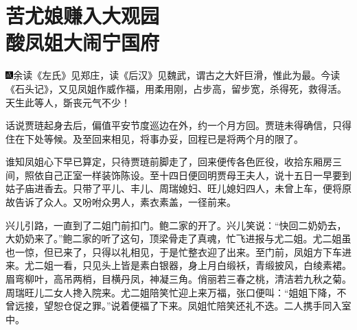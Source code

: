 
\chapter{苦尤娘赚入大观园\\酸凤姐大闹宁国府}

{\includegraphics[width=3mm]{../Images/00005}\kaishu 余读《左氏》见郑庄，读《后汉》见魏武，谓古之大奸巨滑，惟此为最。今读《石头记》，又见凤姐作威作福，用柔用刚，占步高，留步宽，杀得死，救得活。天生此等人，斲丧元气不少！}

话说贾琏起身去后，偏值平安节度巡边在外，约一个月方回。贾琏未得确信，只得住在下处等候。及至回来相见，将事办妥，回程已是将两个月的限了。

谁知凤姐心下早已算定，只待贾琏前脚走了，回来便传各色匠役，收拾东厢房三间，照依自己正室一样装饰陈设。至十四日便回明贾母王夫人，说十五日一早要到姑子庙进香去。只带了平儿、丰儿、周瑞媳妇、旺儿媳妇四人，未曾上车，便将原故告诉了众人。又吩咐众男人，素衣素盖，一径前来。

兴儿引路，一直到了二姐门前扣门。鲍二家的开了。兴儿笑说：``快回二奶奶去，大奶奶来了。''鲍二家的听了这句，顶梁骨走了真魂，忙飞进报与尤二姐。尤二姐虽也一惊，但已来了，只得以礼相见，于是忙整衣迎了出来。至门前，凤姐方下车进来。尤二姐一看，只见头上皆是素白银器，身上月白缎袄，青缎披风，白绫素裙。眉弯柳叶，高吊两梢，目横丹凤，神凝三角。俏丽若三春之桃，清洁若九秋之菊。周瑞旺儿二女人搀入院来。尤二姐陪笑忙迎上来万福，张口便叫：``姐姐下降，不曾远接，望恕仓促之罪。''说着便福了下来。凤姐忙陪笑还礼不迭。二人携手同入室中。


